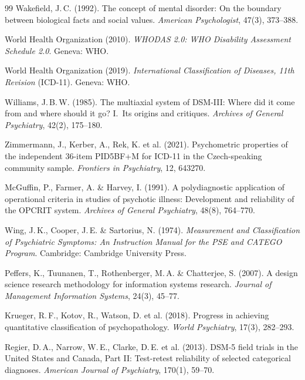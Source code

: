 \documentclass[11pt,a4paper]{article}
\begin{document}
\begin{thebibliography}{99}
Wakefield, J.\,C. (1992).
\newblock The concept of mental disorder: On the boundary between biological facts and social values.
\newblock \textit{American Psychologist}, 47(3), 373--388.

World Health Organization (2010).
\newblock \textit{WHODAS 2.0: WHO Disability Assessment Schedule 2.0}.
\newblock Geneva: WHO.

World Health Organization (2019).
\newblock \textit{International Classification of Diseases, 11th Revision} (ICD-11).
\newblock Geneva: WHO.

Williams, J.\,B.\,W. (1985).
\newblock The multiaxial system of DSM-III: Where did it come from and where should it go? I.\ Its origins and critiques.
\newblock \textit{Archives of General Psychiatry}, 42(2), 175--180.

Zimmermann, J., Kerber, A., Rek, K. et al. (2021).
\newblock Psychometric properties of the independent 36-item PID5BF+M for ICD-11 in the Czech-speaking community sample.
\newblock \textit{Frontiers in Psychiatry}, 12, 643270.

McGuffin, P., Farmer, A. \& Harvey, I. (1991).
\newblock A polydiagnostic application of operational criteria in studies of psychotic illness: Development and reliability of the OPCRIT system.
\newblock \textit{Archives of General Psychiatry}, 48(8), 764--770.

Wing, J.\,K., Cooper, J.\,E. \& Sartorius, N. (1974).
\newblock \textit{Measurement and Classification of Psychiatric Symptoms: An Instruction Manual for the PSE and CATEGO Program}.
\newblock Cambridge: Cambridge University Press.

Peffers, K., Tuunanen, T., Rothenberger, M.\,A. \& Chatterjee, S. (2007).
\newblock A design science research methodology for information systems research.
\newblock \textit{Journal of Management Information Systems}, 24(3), 45--77.

Krueger, R.\,F., Kotov, R., Watson, D. et al. (2018).
\newblock Progress in achieving quantitative classification of psychopathology.
\newblock \textit{World Psychiatry}, 17(3), 282--293.

Regier, D.\,A., Narrow, W.\,E., Clarke, D.\,E. et al. (2013).
\newblock DSM-5 field trials in the United States and Canada, Part II: Test-retest reliability of selected categorical diagnoses.
\newblock \textit{American Journal of Psychiatry}, 170(1), 59--70.


\end{thebibliography}
\end{document}
